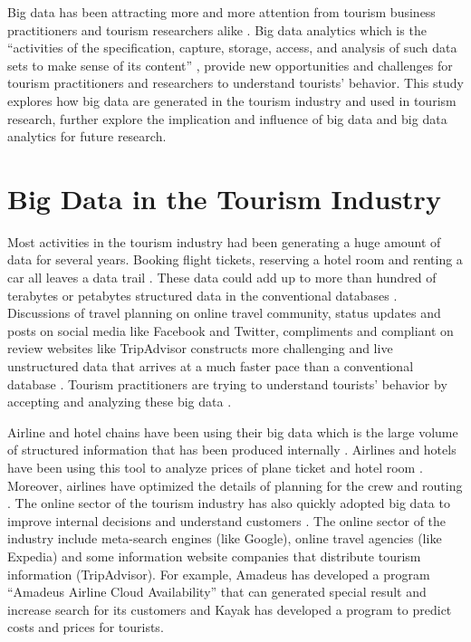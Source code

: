 \documentclass[sigconf]{acmart}
\begin{document}
Big data has been attracting more and more attention from tourism business practitioners 
and tourism researchers alike \cite{GUO2017467}. Big data analytics which is the ``activities
of the specification, capture, storage, access, and analysis of such data sets to make sense
of its content'' \cite{MIAH2017}, provide new opportunities and challenges for tourism practitioners and researchers to understand tourists' behavior. This study explores how
big data are generated in the tourism industry and used in tourism research, further
explore the implication and influence of big data and big data analytics for future
research. 

\section{Big Data in the Tourism Industry}
Most activities in the tourism industry had been generating a huge amount of data for
several years. Booking flight tickets, reserving a hotel room and renting a car all
leaves a data trail \cite{Shafiee16}. These data could add up to more than hundred of
terabytes or petabytes structured data in the conventional databases \cite{akerkar2012}.
Discussions of travel planning on online travel community, status updates and posts on
social media like Facebook and Twitter, compliments and compliant on review websites like TripAdvisor
constructs more challenging and live unstructured data that arrives at a much
faster pace than a conventional database \cite{akerkar2012}. Tourism practitioners are
trying to understand tourists' behavior by accepting and analyzing these big data 
\cite{Shafiee16}.

Airline and hotel chains have been using their big data which is the large volume of
structured information that has been produced internally \cite{MIAH2017}. Airlines and
hotels have been using this tool to analyze prices of plane ticket and hotel room
\cite{GJT14}. Moreover, airlines have optimized the details of planning for the crew and
routing \cite{Shafiee16, GJT14}. The online sector of the tourism industry has also
quickly adopted big data to improve internal decisions and understand customers 
\cite{akerkar2012}. The online sector of the industry include  meta-search engines (like 
Google), online travel agencies (like Expedia) and some information website companies that
distribute tourism information (TripAdvisor)\cite{MIAH2017}. For example, Amadeus has 
developed a program ``Amadeus Airline Cloud Availability'' that can generated special 
result and increase search for its customers and Kayak has developed a program to predict 
costs and prices for tourists\cite{Shafiee16}.
\end{document}
